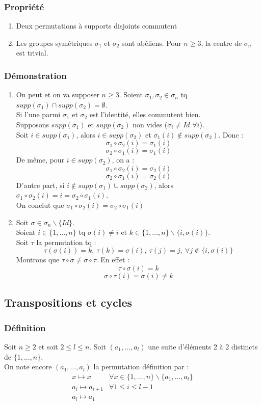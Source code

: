 \documentclass[a4paper, oneside]{report}
\newcommand{\defi}{\subsubsection{Définition}}
\newcommand{\dem}{\subsubsection{Démonstration}}
\newcommand{\propr}{\subsubsection{Propriété}}
\begin{document}
\propr
\begin{enumerate}
\item Deux permutations à supports disjoints commutent
\item Les groupes symétriques $\sigma_1$ et $\sigma_2$ sont abéliens. Pour $n\geq 3$, la centre de $\sigma_n$ est trivial.
\end{enumerate}

\dem
\begin{enumerate}
\item On peut et on va supposer $n\geq 3$. Soient $\sigma_1,\sigma_2 \in \sigma_n$ tq $supp(\sigma_1)\cap supp(\sigma_2) = \emptyset$.\\
Si l'une parmi $\sigma_1$ et $\sigma_2$ est l'identité, elles commutent bien.\\
Supposons $supp(\sigma_1)$ et $supp(\sigma_2)$ non vides ($\sigma_i \neq Id$ $\forall i$).\\
Soit $i\in supp(\sigma_1)$, alors $i\in supp(\sigma_2)$ et $\sigma_1(i)\notin supp(\sigma_2)$. Donc :
$$\sigma_1 \circ \sigma_2(i)=\sigma_1(i)$$
$$\sigma_2 \circ \sigma_1(i)=\sigma_1(i)$$
De même, pour $i\in supp(\sigma_2)$, on a :
$$\sigma_1 \circ \sigma_2(i)=\sigma_2(i)$$
$$\sigma_2 \circ \sigma_1(i)=\sigma_2(i)$$
D'autre part, si $i\notin supp(\sigma_1)\cup supp(\sigma_2)$, alors $\sigma_1 \circ \sigma_2(i) = i = \sigma_2 \circ \sigma_1(i)$.\\
On conclut que $\sigma_1 \circ \sigma_2(i)= \sigma_2 \circ \sigma_1(i)$

\item Soit $\sigma \in \sigma_n \backslash \{Id\}$.\\
Soient $i\in \{1,...,n\}$ tq $\sigma(i)\neq i$ et $k\in \{1,...,n\}\backslash \{i, \sigma(i) \}$.\\
Soit $\tau$ la permutation tq :
$$\tau(\sigma (i))=k,~\tau(k)=\sigma(i),~\tau(j)=j,~\forall j\notin \{i,\sigma(i) \}$$
Montrons que $\tau \circ \sigma \neq \sigma \circ \tau$. En effet :
$$\tau \circ \sigma (i) = k$$
$$\sigma \circ \tau (i) = \sigma(i) \neq k$$
\end{enumerate}

\subsection{Transpositions et cycles}

\defi
Soit $n\geq 2$ et soit $2 \leq l \leq n$. Soit $(a_1,...,a_l)$ une suite d'éléments 2 à 2 distincts de $\{1,...,n\}$. \\
On note encore $(a_1,...,a_l)$ la permutation définition par :
$$\begin{array}{ll}
x\mapsto x & \forall x \in \{1,...,n \}\backslash \{a_1,...,a_l\}\\
a_i\mapsto a_{i+1}& \forall 1\leq i \leq l-1\\
a_l\mapsto a_1&
\end{array}
$$
\end{document}

